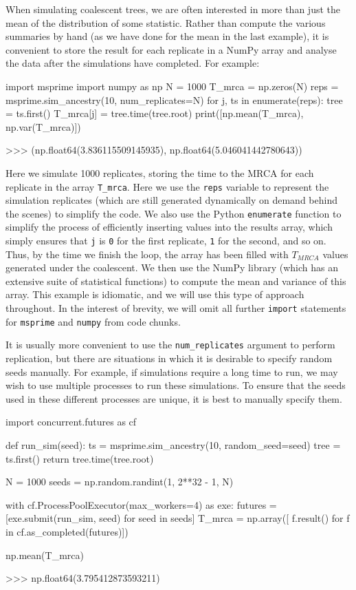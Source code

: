 \documentclass[graybox]{svmult}
\begin{document}
When simulating coalescent trees, we are often interested in more than
just the mean of the distribution of some statistic. Rather than compute
the various summaries by hand (as we have done for the mean in the last
example), it is convenient to store the result for each
replicate in a NumPy array and analyse the data after the simulations have completed.
For example:

\begin{pythoncode}
import msprime
import numpy as np
N = 1000
T_mrca = np.zeros(N)
reps = msprime.sim_ancestry(10, num_replicates=N)
for j, ts in enumerate(reps):
    tree = ts.first()
    T_mrca[j] = tree.time(tree.root)
print([np.mean(T_mrca), np.var(T_mrca)])

>>> (np.float64(3.836115509145935), np.float64(5.046041442780643))
\end{pythoncode}

Here we simulate 1000 replicates, storing the time to the MRCA for each replicate in the array \texttt{T\_mrca}.
Here we use the \texttt{reps} variable
to represent the simulation replicates (which are still generated dynamically
on demand behind the scenes) to simplify the code.
We also use the Python \texttt{enumerate} function to simplify the process of efficiently inserting values into
the results array, which simply ensures that \texttt{j} is \texttt{0} for the first replicate,
\texttt{1} for the second, and so on.
Thus, by the time we finish the
loop, the array has been filled with $T_{MRCA}$ values generated
under the coalescent. We then use the NumPy library (which has
an extensive suite of statistical functions) to compute the mean and
variance of this array. This example is idiomatic, and we will use this
type of approach throughout.
In the interest of brevity, we will omit all
further \texttt{import} statements for \texttt{msprime} and \texttt{numpy}
from code chunks.

It is usually more convenient to use the \texttt{num\_replicates}
argument to perform replication, but there are situations in which it is
desirable to specify random seeds manually. For example, if simulations
require a long time to run, we may wish to use multiple processes to
run these simulations. To ensure that the seeds used in these different
processes are unique, it is best to manually specify them.

\begin{pythoncode}
import concurrent.futures as cf

def run_sim(seed):
    ts = msprime.sim_ancestry(10, random_seed=seed)
    tree = ts.first()
    return tree.time(tree.root)

N = 1000
seeds = np.random.randint(1, 2**32 - 1, N)

with cf.ProcessPoolExecutor(max_workers=4) as exe:
     futures = [exe.submit(run_sim, seed) for seed in seeds]
     T_mrca = np.array([
        f.result() for f in cf.as_completed(futures)])

np.mean(T_mrca)

>>> np.float64(3.795412873593211)
\end{pythoncode}
\end{document}
